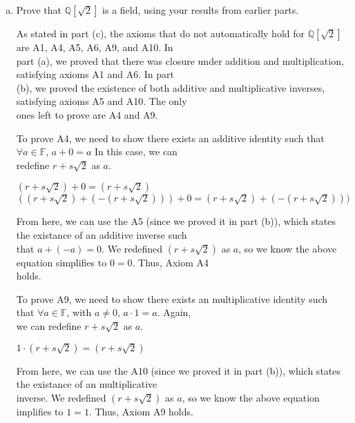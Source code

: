 \documentclass{article}
\begin{document}
\begin{flushleft}
\begin{enumerate}[a)]
\item Prove that $\mathbb{Q}[\sqrt{2}]$ is a field, using your results from earlier parts.

\vspace{.5cm}

\qquad As stated in part (c), the axioms that do not automatically hold for $\mathbb{Q}[\sqrt{2}]$ are A1, A4, A5, A6, A9, and A10. In \\
\qquad  part (a), we proved that there was closure under addition and multiplication, satisfying axioms A1 and A6. In part \\
\qquad (b), we proved the existence of both additive and multiplicative inverses, satisfying axioms A5 and A10. The only \\
\qquad ones left to prove are A4 and A9. 

\vspace{.5cm}

\qquad To prove A4, we need to show there exists an additive identity such that $\forall a \in \mathbb{F}$, $a+0=a$ In this case, we can \\
\qquad redefine $r + s\sqrt{2}$ as $a$.

\begin{center}
$(r + s \sqrt{2}) + 0 = (r + s \sqrt{2})$\\
$((r + s \sqrt{2}) + (-(r + s \sqrt{2}))) + 0 = (r + s \sqrt{2}) + (-(r + s \sqrt{2})))$
\end{center}

\qquad From here, we can use the A5 (since we proved it in part (b)), which states the existance of an additive inverse such \\
\qquad that $a + (-a)=0$. We redefined $(r + s \sqrt{2})$ as $a$, so we know the above equation simplifies to $0=0$. Thus, Axiom A4\\
\qquad holds. 

\vspace{.5cm}

\qquad To prove A9, we need to show there exists an multiplicative identity such that $\forall a \in \mathbb{F}$, with $a \neq 0$, $a\cdot 1=a$. Again, \\
\qquad we can redefine $r + s\sqrt{2}$ as $a$.

\begin{center}
$1 \cdot (r + s \sqrt{2}) = (r + s \sqrt{2})$\\
\end{center}

\qquad From here, we can use the A10 (since we proved it in part (b)), which states the existance of an multiplicative \\
\qquad inverse. We redefined $(r + s \sqrt{2})$ as $a$, so we know the above equation implifies to $1=1$. Thus, Axiom A9 holds.


\end{enumerate}
\end{flushleft}
\end{document}
